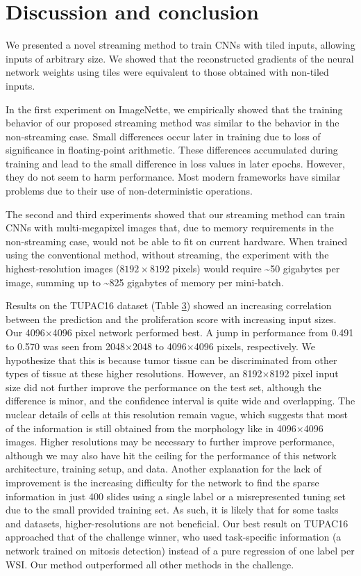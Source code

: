 \documentclass[
  12pt,
  a5,margin=2cmpaper,
]{article}
\begin{document}
\hypertarget{discussion-and-conclusion}{%
\section{Discussion and conclusion}\label{discussion-and-conclusion}}

We presented a novel streaming method to train CNNs with tiled inputs,
allowing inputs of arbitrary size. We showed that the reconstructed
gradients of the neural network weights using tiles were equivalent to
those obtained with non-tiled inputs.

In the first experiment on ImageNette, we empirically showed that the
training behavior of our proposed streaming method was similar to the
behavior in the non-streaming case. Small differences occur later in
training due to loss of significance in floating-point arithmetic. These
differences accumulated during training and lead to the small difference
in loss values in later epochs. However, they do not seem to harm
performance. Most modern frameworks have similar problems due to their
use of non-deterministic operations.

The second and third experiments showed that our streaming method can
train CNNs with multi-megapixel images that, due to memory requirements
in the non-streaming case, would not be able to fit on current hardware.
When trained using the conventional method, without streaming, the
experiment with the highest-resolution images (\(8192 \times 8192\)
pixels) would require \textasciitilde50 gigabytes per image, summing up
to \textasciitilde825 gigabytes of memory per mini-batch.

Results on the TUPAC16 dataset (Table
\protect\hyperlink{tab:tupacresults}{3}) showed an increasing
correlation between the prediction and the proliferation score with
increasing input sizes. Our 4096\(\times\)4096 pixel network performed
best. A jump in performance from 0.491 to 0.570 was seen from
2048\(\times\)2048 to 4096\(\times\)4096 pixels, respectively. We
hypothesize that this is because tumor tissue can be discriminated from
other types of tissue at these higher resolutions. However, an
8192\(\times\)8192 pixel input size did not further improve the
performance on the test set, although the difference is minor, and the
confidence interval is quite wide and overlapping. The nuclear details
of cells at this resolution remain vague, which suggests that most of
the information is still obtained from the morphology like in
4096\(\times\)4096 images. Higher resolutions may be necessary to
further improve performance, although we may also have hit the ceiling
for the performance of this network architecture, training setup, and
data. Another explanation for the lack of improvement is the increasing
difficulty for the network to find the sparse information in just 400
slides using a single label or a misrepresented tuning set due to the
small provided training set. As such, it is likely that for some tasks
and datasets, higher-resolutions are not beneficial. Our best result on
TUPAC16 approached that of the challenge winner, who used task-specific
information (a network trained on mitosis detection) instead of a pure
regression of one label per WSI. Our method outperformed all other
methods in the challenge.
\end{document}
